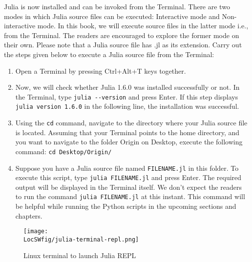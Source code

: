 Julia is now installed and can be invoked from the Terminal. There are two modes in which Julia
source files can be executed: Interactive mode and Non-interactive mode. In this book,
we will execute source files in the latter mode i.e., from the Terminal. The readers are encouraged to explore
the former mode on their own. Please note that a Julia source file has .jl
as its extension. Carry out the steps given below to execute a Julia source file from
the Terminal:
\begin{enumerate}
      \item Open a Terminal by pressing Ctrl+Alt+T keys together.
      \item Now, we will check whether Julia 1.6.0 was installed successfully or not.
            In the Terminal, type {\tt julia -{}-version} and press Enter.
            If this step displays {\tt julia version 1.6.0} in the following line, the installation was successful.
      \item Using the {\tt cd} command, navigate to the directory where your Julia source file is located.
            Assuming that your Terminal points to the
            home directory, and you want to navigate to the folder Origin on
            Desktop, execute the following command: {\tt cd Desktop/Origin/}
      \item Suppose you have a Julia source file named {\tt FILENAME.jl} in this
            folder. To execute this script, type {\tt julia FILENAME.jl} and press
            Enter. The required output will be displayed in the Terminal itself.
            We don't expect the readers to run the command {\tt julia FILENAME.jl} at
            this instant. This command will be helpful while running the Python
            scripts in the upcoming sections and chapters.
\end{enumerate}

\begin{figure}
      \centering
      \texttt{[image: \\LocSWfig/julia-terminal-repl.png]}
      \caption{Linux terminal to launch Julia REPL}
      \label{julia-repl}
\end{figure}



